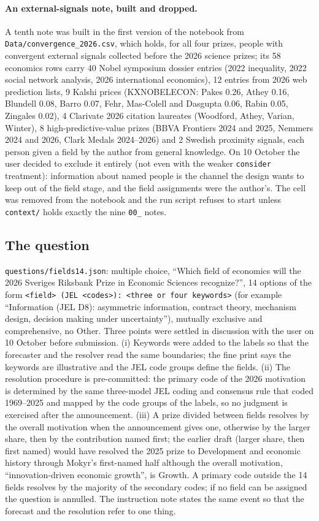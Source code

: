 \documentclass[11pt,a4paper]{article}
\newcommand{\code}[1]{\texttt{#1}}
\begin{document}
\paragraph{An external-signals note, built and dropped.} A tenth note was built in the first version of the
notebook from \code{Data/convergence\_2026.csv}, which holds, for all four prizes, people with convergent external
signals collected before the 2026 science prizes; its 58 economics rows carry 40 Nobel symposium dossier entries
(2022 inequality, 2022 social network analysis, 2026 international economics), 12 entries from 2026 web prediction
lists, 9 Kalshi prices (KXNOBELECON: Pakes 0.26, Athey 0.16, Blundell 0.08, Barro 0.07, Fehr, Mas-Colell and Dasgupta
0.06, Rabin 0.05, Zingales 0.02), 4 Clarivate 2026 citation laureates (Woodford, Athey, Varian, Winter), 8
high-predictive-value prizes (BBVA Frontiers 2024 and 2025, Nemmers 2024 and 2026, Clark Medals 2024--2026) and 2
Swedish proximity signals, each person given a field by the author from general knowledge. On 10 October the user
decided to exclude it entirely (not even with the weaker \code{consider} treatment): information about named people
is the channel the design wants to keep out of the field stage, and the field assignments were the author's. The cell
was removed from the notebook and the run script refuses to start unless \code{context/} holds exactly the nine
\code{00\_} notes.

\subsection{The question}

\code{questions/fields14.json}: multiple choice, ``Which field of economics will the 2026 Sveriges Riksbank Prize in
Economic Sciences recognize?'', 14 options of the form \code{<field> (JEL <codes>): <three or four keywords>}
(for example ``Information (JEL D8): asymmetric information, contract theory, mechanism design, decision making under
uncertainty''), mutually exclusive and comprehensive, no Other. Three points were settled in discussion with the user
on 10 October before submission. (i) Keywords were added to the labels so that the forecaster and the resolver read
the same boundaries; the fine print says the keywords are illustrative and the JEL code groups define the fields.
(ii) The resolution procedure is pre-committed: the primary code of the 2026 motivation is determined by the same
three-model JEL coding and consensus rule that coded 1969--2025 and mapped by the code groups of the labels, so no
judgment is exercised after the announcement. (iii) A prize divided between fields resolves by the overall motivation
when the announcement gives one, otherwise by the larger share, then by the contribution named first; the earlier
draft (larger share, then first named) would have resolved the 2025 prize to Development and economic history through
Mokyr's first-named half although the overall motivation, ``innovation-driven economic growth'', is Growth. A primary
code outside the 14 fields resolves by the majority of the secondary codes; if no field can be assigned the question
is annulled. The instruction note states the same event so that the forecast and the resolution refer to one thing.
\end{document}
